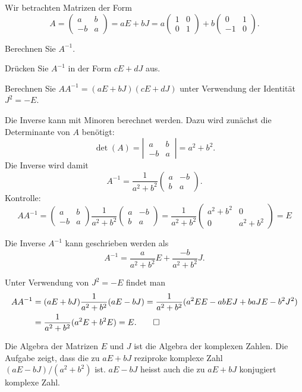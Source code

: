 Wir betrachten Matrizen der Form
\[
A=\begin{pmatrix}a&b\\-b&a\end{pmatrix}
=aE+bJ=a\begin{pmatrix}1&0\\0&1\end{pmatrix}+b\begin{pmatrix}0&1\\-1&0\end{pmatrix}.
\]
\begin{teilaufgaben}
\item
Berechnen Sie $A^{-1}$.
\item
Drücken Sie $A^{-1}$ in der Form $cE+dJ$ aus.
\item
Berechnen Sie $AA^{-1}=(aE+bJ)(cE+dJ)$ unter Verwendung der Identität
$J^2=-E$.
\end{teilaufgaben}

\begin{loesung}
\begin{teilaufgaben}
\item
Die Inverse kann mit Minoren berechnet werden.
Dazu wird zunächst die Determinante von $A$ benötigt:
\[
\det(A)=\left|\,\begin{matrix}a&b\\-b&a\end{matrix}\,\right|=a^2+b^2.
\]
Die Inverse wird damit
\[
A^{-1}=\frac1{a^2+b^2}\begin{pmatrix}a&-b\\b&a\end{pmatrix}.
\]
Kontrolle:
\[
AA^{-1}
=
\begin{pmatrix}a&b\\-b&a\end{pmatrix}
\frac{1}{a^2+b^2}
\begin{pmatrix}a&-b\\b&a\end{pmatrix}
=
\frac{1}{a^2+b^2}
\begin{pmatrix}a^2+b^2&0\\0&a^2+b^2 \end{pmatrix}=E
\]
\item
Die Inverse $A^{-1}$ kann geschrieben werden als
\[
A^{-1}
=
\frac{a}{a^2+b^2}E
+
\frac{-b}{a^2+b^2}J.
\]
\item Unter Verwendung von $J^2=-E$ findet man
\begin{align*}
AA^{-1}&=(aE+bJ)\frac1{a^2+b^2}(aE-bJ)
=\frac1{a^2+b^2}(a^2EE-abEJ+baJE-b^2J^2)
\\
&=\frac1{a^2+b^2}(a^2E+b^2E)=E.
\qedhere
\end{align*}
\end{teilaufgaben}
\end{loesung}

\begin{diskussion}
Die Algebra der Matrizen $E$ und $J$ ist die Algebra der komplexen Zahlen.
Die Aufgabe zeigt, dass die zu $aE+bJ$ reziproke komplexe Zahl
$(aE-bJ)/(a^2+b^2)$ ist.
$aE-bJ$ heisst auch die zu $aE+bJ$ konjugiert komplexe Zahl.
\end{diskussion}

